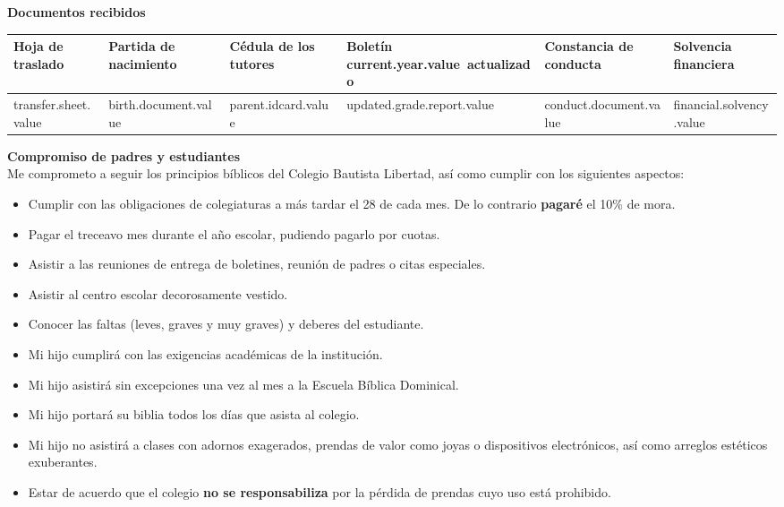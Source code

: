 \documentclass[12pt]{article}
\newcommand{\transferSheet}{transfer.sheet.value}
\newcommand{\currentYear}{current.year.value}
\newcommand{\birthDocument}{birth.document.value}
\newcommand{\parentIdcard}{parent.idcard.value}
\newcommand{\updatedGradeReport}{updated.grade.report.value}
\newcommand{\conductDocument}{conduct.document.value}
\newcommand{\financialSolvency}{financial.solvency.value}
\begin{document}
    \par\vspace{7mm}
    \textbf{Documentos recibidos}
    \begin{table}[H]
        \centering
        \begin{tabular}{|p{1.8cm}|p{2.3cm}|p{2.2cm}|p{2.5cm}|p{2.5cm}|p{2cm}|}
            \hline
            Hoja de traslado &
            Partida de nacimiento &
            Cédula de los tutores &
            Boletín \currentYear\ actualizado &
            Constancia de conducta &
            Solvencia financiera\\
            \hline
            \hspace{6mm}\transferSheet &
            \hspace{9mm}\birthDocument &
            \hspace{9mm}\parentIdcard &
            \hspace{10mm}\updatedGradeReport &
            \hspace{10mm}\conductDocument &
            \hspace{7mm}\financialSolvency\\
            \hline
        \end{tabular}
    \end{table}
    \textbf{Compromiso de padres y estudiantes}\\
    Me comprometo a seguir los principios bíblicos del Colegio Bautista Libertad, así como cumplir con los siguientes aspectos:
    \begin{itemize}
        \item Cumplir con las obligaciones de colegiaturas a más tardar el 28 de cada mes. De lo contrario \textbf{pagaré} el 10\% de mora.
        \item Pagar el treceavo mes durante el año escolar, pudiendo pagarlo por cuotas.
        \item Asistir a las reuniones de entrega de boletines, reunión de padres o citas especiales.
        \item Asistir al centro escolar decorosamente vestido.
        \item Conocer las faltas (leves, graves y muy graves) y deberes del estudiante.
        \item Mi hijo cumplirá con las exigencias académicas de la institución.
        \item Mi hijo asistirá sin excepciones una vez al mes a la Escuela Bíblica Dominical.
        \item Mi hijo portará su biblia todos los días que asista al colegio.
        \item Mi hijo no asistirá a clases con adornos exagerados, prendas de valor como joyas o dispositivos electrónicos, así como arreglos estéticos exuberantes.
        \item Estar de acuerdo que el colegio \textbf{no se responsabiliza} por la pérdida de prendas cuyo uso está prohibido.
    \end{itemize}
\end{document}
